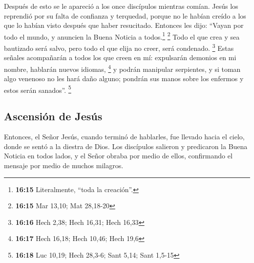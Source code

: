  Después de esto se le apareció a los once discípulos
mientras comían. Jesús los reprendió por su falta de confianza y
terquedad, porque no le habían creído a los que lo habían visto después
que haber resucitado.  Entonces les dijo: ``Vayan por
todo el mundo, y anuncien la Buena Noticia a todos.\footnote{\textbf{16:15}
  Literalmente, ``toda la creación''.} \footnote{\textbf{16:15} Mar
  13,10; Mat 28,18-20}  Todo el que crea y sea bautizado
será salvo, pero todo el que elija no creer, será condenado. \footnote{\textbf{16:16}
  Hech 2,38; Hech 16,31; Hech 16,33}  Estas señales
acompañarán a todos los que creen en mí: expulsarán demonios en mi
nombre, hablarán nuevos idiomas, \footnote{\textbf{16:17} Hech 16,18;
  Hech 10,46; Hech 19,6}  y podrán manipular serpientes,
y si toman algo venenoso no les hará daño alguno; pondrán sus manos
sobre los enfermos y estos serán sanados''. \footnote{\textbf{16:18} Luc
  10,19; Hech 28,3-6; Sant 5,14; Sant 1,5-15}

\hypertarget{ascensiuxf3n-de-jesuxfas}{%
\subsection{Ascensión de Jesús}\label{ascensiuxf3n-de-jesuxfas}}

 Entonces, el Señor Jesús, cuando terminó de hablarles,
fue llevado hacia el cielo, donde se sentó a la diestra de Dios.
 Los discípulos salieron y predicaron la Buena Noticia en
todos lados, y el Señor obraba por medio de ellos, confirmando el
mensaje por medio de muchos milagros.
